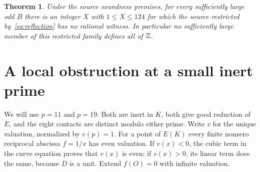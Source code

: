 \documentclass[11pt,a4paper]{article}
\newtheorem{theorem}{Theorem}[section]\newtheorem{lemma}[theorem]{Lemma}\newtheorem{proposition}[theorem]{Proposition}\newtheorem{corollary}[theorem]{Corollary}
\begin{document}
\begin{theorem}\label{thm:uniform}
Under the source soundness premises, for every sufficiently large odd
$B$ there is an integer $X$ with $1\le X\le124$ for which the source
restricted by~\eqref{eq:reflection} has no rational witness.
In particular no sufficiently large member of this restricted family
defines all of $\mathbb Z$.
\end{theorem}

\section{A local obstruction at a small inert prime}
We will use $p=11$ and $p=19$. Both are inert in $K$, both give good
reduction of $E$, and the eight contacts are distinct modulo either prime.
Write $v$ for the unique valuation, normalized by $v(p)=1$.
For a point of $E(K)$ every finite nonzero reciprocal abscissa $f=1/x$
has even valuation. If $v(x)<0$, the cubic term in the curve equation
proves that $v(x)$ is even; if $v(x)>0$, its linear term does the same,
because $D$ is a unit. Extend $f(O)=0$ with infinite valuation.
\end{document}
